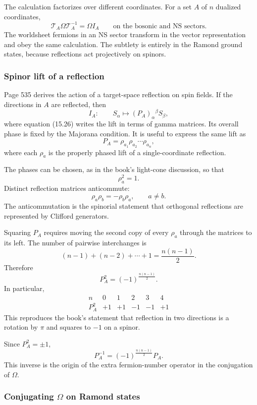 \documentclass[
  10pt,
  a4paper,
  openany]{book}
\begin{document}
The calculation factorizes over different coordinates. For a set \(A\)
of \(n\) dualized coordinates, \[
\boxed{
\mathcal T_A\Omega\mathcal T_A^{-1}
=
\Omega I_A
\qquad
\text{on the bosonic and NS sectors}
}.
\] The worldsheet fermions in an NS sector transform in the vector
representation and obey the same calculation. The subtlety is entirely
in the Ramond ground states, because reflections act projectively on
spinors.

\subsubsection{Spinor lift of a
reflection}\label{spinor-lift-of-a-reflection}

Page 535 derives the action of a target-space reflection on spin fields.
If the directions in \(A\) are reflected, then \[
I_A:
\qquad
S_\alpha
\longmapsto
(P_A)_\alpha{}^\beta S_\beta,
\] where equation (15.26) writes the lift in terms of gamma matrices.
Its overall phase is fixed by the Majorana condition. It is useful to
express the same lift as \[
P_A
=
\rho_{a_1}\rho_{a_2}\cdots\rho_{a_n},
\] where each \(\rho_a\) is the properly phased lift of a
single-coordinate reflection.

The phases can be chosen, as in the book's light-cone discussion, so
that \[
\rho_a^2=1.
\] Distinct reflection matrices anticommute: \[
\rho_a\rho_b
=
-\rho_b\rho_a,
\qquad
a\neq b.
\] The anticommutation is the spinorial statement that orthogonal
reflections are represented by Clifford generators.

Squaring \(P_A\) requires moving the second copy of every \(\rho_a\)
through the matrices to its left. The number of pairwise interchanges is
\[
(n-1)+(n-2)+\cdots+1
=
\frac{n(n-1)}2.
\] Therefore \[
\boxed{
P_A^2
=
(-1)^{\frac{n(n-1)}2}
}.
\] In particular, \[
\begin{array}{c|ccccc}
n&0&1&2&3&4\\ \hline
P_A^2&+1&+1&-1&-1&+1
\end{array}
\] This reproduces the book's statement that reflection in two
directions is a rotation by \(\pi\) and squares to \(-1\) on a spinor.

Since \(P_A^2=\pm1\), \[
P_A^{-1}
=
(-1)^{\frac{n(n-1)}2}P_A.
\] This inverse is the origin of the extra fermion-number operator in
the conjugation of \(\Omega\).

\subsubsection{\texorpdfstring{Conjugating \(\Omega\) on Ramond
states}{Conjugating \textbackslash Omega on Ramond states}}\label{conjugating-omega-on-ramond-states}
\end{document}
